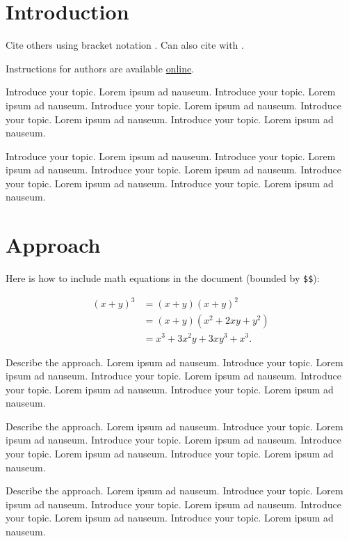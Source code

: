 \documentclass{bioinfo}
\begin{document}
\section{Introduction}

Cite others using bracket notation \citep{pepe2003statistical}. Can also
cite with \citet{zou2005regularization}.

Instructions for authors are available
\href{http://www.oxfordjournals.org/our_journals/bioinformatics/for_authors/general.html}{online}.

Introduce your topic. Lorem ipsum ad nauseum. Introduce your topic.
Lorem ipsum ad nauseum. Introduce your topic. Lorem ipsum ad nauseum.
Introduce your topic. Lorem ipsum ad nauseum. Introduce your topic.
Lorem ipsum ad nauseum.

Introduce your topic. Lorem ipsum ad nauseum. Introduce your topic.
Lorem ipsum ad nauseum. Introduce your topic. Lorem ipsum ad nauseum.
Introduce your topic. Lorem ipsum ad nauseum. Introduce your topic.
Lorem ipsum ad nauseum.

\section{Approach}

Here is how to include math equations in the document (bounded by
\texttt{\$\$}):

\[
\begin{aligned}
(x+y)^3&=(x+y)(x+y)^2\\
       &=(x+y)(x^2+2xy+y^2) \label{eqn:example} \\
       &=x^3+3x^2y+3xy^3+x^3. 
\end{aligned}
\]

Describe the approach. Lorem ipsum ad nauseum. Introduce your topic.
Lorem ipsum ad nauseum. Introduce your topic. Lorem ipsum ad nauseum.
Introduce your topic. Lorem ipsum ad nauseum. Introduce your topic.
Lorem ipsum ad nauseum.

Describe the approach. Lorem ipsum ad nauseum. Introduce your topic.
Lorem ipsum ad nauseum. Introduce your topic. Lorem ipsum ad nauseum.
Introduce your topic. Lorem ipsum ad nauseum. Introduce your topic.
Lorem ipsum ad nauseum.

Describe the approach. Lorem ipsum ad nauseum. Introduce your topic.
Lorem ipsum ad nauseum. Introduce your topic. Lorem ipsum ad nauseum.
Introduce your topic. Lorem ipsum ad nauseum. Introduce your topic.
Lorem ipsum ad nauseum.
\end{document}
